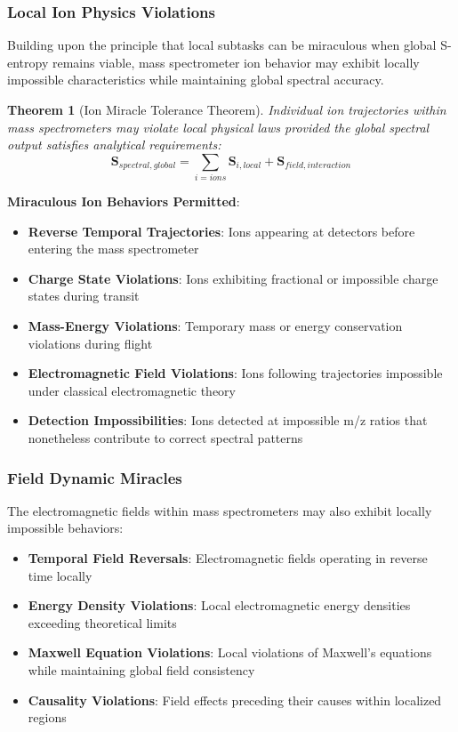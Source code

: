 \documentclass[11pt,a4paper]{article}
\newtheorem{theorem}{Theorem}[section]
\theoremstyle{remark}
\begin{document}
\subsubsection{Local Ion Physics Violations}

Building upon the principle that local subtasks can be miraculous when global S-entropy remains viable, mass spectrometer ion behavior may exhibit locally impossible characteristics while maintaining global spectral accuracy.

\begin{theorem}[Ion Miracle Tolerance Theorem]
Individual ion trajectories within mass spectrometers may violate local physical laws provided the global spectral output satisfies analytical requirements:
\begin{equation}
\mathbf{S}_{spectral,global} = \sum_{i=ions} \mathbf{S}_{i,local} + \mathbf{S}_{field,interaction}
\end{equation}
\end{theorem}

\textbf{Miraculous Ion Behaviors Permitted}:
\begin{itemize}
\item \textbf{Reverse Temporal Trajectories}: Ions appearing at detectors before entering the mass spectrometer
\item \textbf{Charge State Violations}: Ions exhibiting fractional or impossible charge states during transit
\item \textbf{Mass-Energy Violations}: Temporary mass or energy conservation violations during flight
\item \textbf{Electromagnetic Field Violations}: Ions following trajectories impossible under classical electromagnetic theory
\item \textbf{Detection Impossibilities}: Ions detected at impossible m/z ratios that nonetheless contribute to correct spectral patterns
\end{itemize}

\subsubsection{Field Dynamic Miracles}

The electromagnetic fields within mass spectrometers may also exhibit locally impossible behaviors:

\begin{itemize}
\item \textbf{Temporal Field Reversals}: Electromagnetic fields operating in reverse time locally
\item \textbf{Energy Density Violations}: Local electromagnetic energy densities exceeding theoretical limits
\item \textbf{Maxwell Equation Violations}: Local violations of Maxwell's equations while maintaining global field consistency
\item \textbf{Causality Violations}: Field effects preceding their causes within localized regions
\end{itemize}
\end{document}
